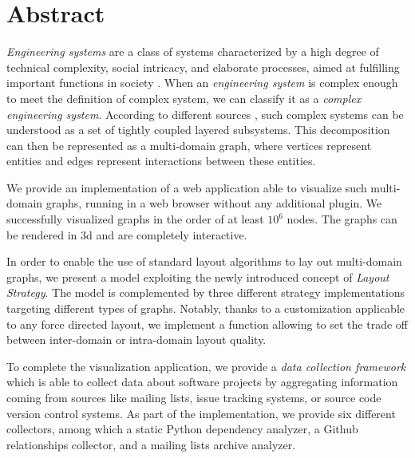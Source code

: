 \vspace*{1cm}
\chapter*{\centering\Large Abstract}

\begin{adjustwidth}{0cm}{0cm}

  \emph{Engineering systems} are a class of systems characterized by a high degree of technical complexity, social intricacy, and elaborate processes, aimed at fulfilling important functions in society \cite{complex}. When an \emph{engineering system} is complex enough to meet the definition of complex system, we can classify it as a \emph{complex engineering system}. According to different sources \cite{decomp,complex,change-prop}, such complex systems can be understood as a set of tightly coupled layered subsystems. This decomposition can then be represented as a multi-domain graph, where vertices represent entities and edges represent interactions between these entities.

  We provide an implementation of a web application able to visualize such multi-domain graphs, running in a web browser without any additional plugin. We successfully visualized graphs in the order of at least $10^6$ nodes. The graphs can be rendered in \gls{3d} and are completely interactive.

In order to enable the use of standard layout algorithms to lay out multi-domain graphs, we present a model exploiting the newly introduced concept of \emph{Layout Strategy}. The model is complemented by three different strategy implementations targeting different types of graphs. Notably, thanks to a customization applicable to any force directed layout, we implement a function allowing to set the trade off between inter-domain or intra-domain layout quality.

To complete the visualization application, we provide a \emph{data collection framework} which is able to collect data about software projects by aggregating information coming from sources like mailing lists, issue tracking systems, or source code version control systems. As part of the implementation, we provide six different collectors, among which a static Python dependency analyzer, a Github relationships collector, and a mailing lists archive analyzer.

\end{adjustwidth}
